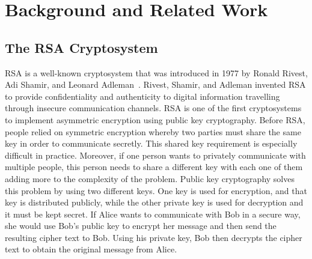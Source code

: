                                                           
                                                          \section{Background and Related Work}
                                                        
                                                        \subsection{The RSA Cryptosystem}
                                                      RSA is a well-known cryptosystem that was introduced in 1977 by Ronald Rivest, Adi Shamir, and  Leonard Adleman~\cite{Rivest1978}. Rivest, Shamir, and Adleman invented RSA to provide confidentiality and authenticity to digital information travelling through insecure communication channels. RSA is one of the first cryptosystems to implement asymmetric encryption using public key cryptography. Before RSA, people relied on symmetric
                                                    encryption whereby two parties must share the same key in order to communicate secretly. This shared key requirement is especially difficult in practice. Moreover, if one person wants to privately communicate with multiple people, this person needs to share a different key with each one of them adding more to the complexity of the problem. Public key cryptography solves this problem by using two different keys. One key is used for
                                                  encryption, and that key is distributed publicly, while the other private key is used for decryption and it must be kept secret. If Alice wants to communicate with Bob in a secure way, she would use Bob's public key to encrypt her message and then send the resulting cipher text to Bob. Using his private key, Bob then decrypts the cipher text to obtain the original message from Alice.
                                                
